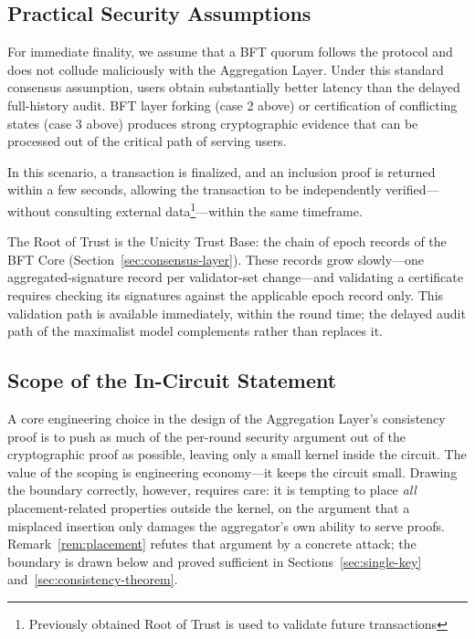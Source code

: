 \documentclass[11pt]{article}
\begin{document}
\subsection{Practical Security Assumptions}
\label{sec:practical}

For immediate finality, we assume that a BFT quorum follows the protocol and does not collude maliciously with the Aggregation Layer. Under this standard consensus assumption, users obtain substantially better latency than the delayed full-history audit. BFT layer forking (case 2 above) or certification of conflicting states (case 3 above) produces strong cryptographic evidence that can be processed out of the critical path of serving users.

In this scenario, a transaction is finalized, and an inclusion proof is returned within a few seconds, allowing the transaction to be independently verified—without consulting external data\footnote{Previously obtained Root of Trust is used to validate future transactions}—within the same timeframe.

The Root of Trust is the Unicity Trust Base: the chain of epoch records of the BFT Core (Section~\ref{sec:consensus-layer}). These records grow slowly---one aggregated-signature record per validator-set change---and validating a certificate requires checking its signatures against the applicable epoch record only. This validation path is available immediately, within the round time; the delayed audit path of the maximalist model complements rather than replaces it.


\subsection{Scope of the In-Circuit Statement}
\label{sec:scope}

A core engineering choice in the design of the Aggregation Layer's consistency proof is to push as much of the per-round security argument out of the cryptographic proof as possible, leaving only a small kernel inside the circuit. The value of the scoping is engineering economy---it keeps the circuit small. Drawing the boundary correctly, however, requires care: it is tempting to place \emph{all} placement-related properties outside the kernel, on the argument that a misplaced insertion only damages the aggregator's own ability to serve proofs. Remark~\ref{rem:placement} refutes that argument by a concrete attack; the boundary is drawn below and proved sufficient in Sections~\ref{sec:single-key} and~\ref{sec:consistency-theorem}.
\end{document}

